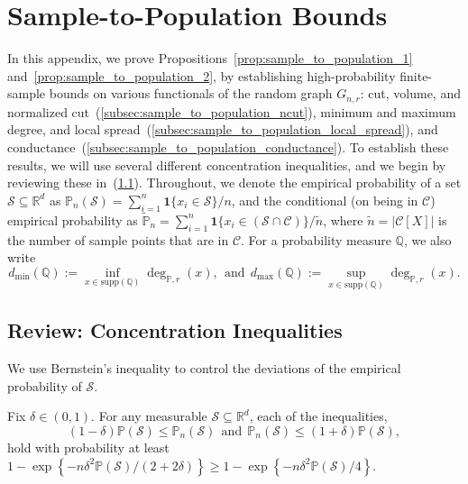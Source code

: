 \documentclass[twoside,11pt]{article}
\newcommand{\Reals}{\mathbb{R}}
\newcommand{\set}[1]{\left\{#1\right\}}
\newcommand{\1}{\mathbf{1}}
\newcommand{\Rd}{\Reals^d}
\newcommand{\mc}[1]{\mathcal{#1}}
\newcommand{\mbb}[1]{\mathbb{#1}}
\newcommand{\Pbb}{\mathbb{P}}
\newcommand{\Qbb}{\mathbb{Q}}
\newcommand{\wt}[1]{\widetilde{#1}}
\begin{document}
\section{Sample-to-Population Bounds}
\label{apdx:sample_to_population}
In this appendix, we prove Propositions~\ref{prop:sample_to_population_1} and~\ref{prop:sample_to_population_2}, by establishing high-probability finite-sample bounds on various functionals of the random graph $G_{n,r}$: cut, volume, and normalized cut~(\ref{subsec:sample_to_population_ncut}), minimum and maximum degree, and local spread~(\ref{subsec:sample_to_population_local_spread}), and conductance~(\ref{subsec:sample_to_population_conductance}). To establish these results, we will use several different concentration inequalities, and we begin by reviewing these in~(\ref{subsec:concentration}). Throughout, we denote the empirical probability of a set $\mc{S} \subseteq \Rd$ as $\Pbb_n(\mc{S}) = \sum_{i = 1}^{n} \1\{x_i \in \mc{S}\}/n$, and the conditional (on being in $\mc{C}$) empirical probability as $\wt{\Pbb}_n = \sum_{i = 1}^{n} \1\{x_i \in (\mc{S} \cap \mc{C})\}/\wt{n}$, where $\wt{n} = |\mc{C}[X]|$ is the number of sample points that are in $\mc{C}$. For a probability measure $\Qbb$, we also write
\begin{equation}
\label{eqn:population_minmax_degree}
d_{\min}(\Qbb) := \inf_{x \in \mathrm{supp}(\mbb{Q})} \deg_{\Pbb,r}(x),~~\textrm{and}~~d_{\max}(\Qbb) := \sup_{x \in \mathrm{supp}(\mbb{Q})} \deg_{\Pbb,r}(x).
\end{equation}

\subsection{Review: Concentration Inequalities}
\label{subsec:concentration}
We use Bernstein's inequality to control the deviations of the empirical probability of $\mc{S}$.
\begin{lemma}
	\label{lem:hoeffding_2}
	Fix $\delta \in (0,1)$. For any measurable $\mc{S} \subseteq \Rd$, each of the inequalities,
	\begin{equation*}
	(1 - \delta) \Pbb(\mathcal{S}) \leq \Pbb_n(\mathcal{S})~~\textrm{and}~~\Pbb_n(\mathcal{S}) \leq (1 + \delta)\Pbb(\mathcal{S}),
	\end{equation*}
	hold with probability at least $1 - \exp\set{-n\delta^2\Pbb(\mathcal{S})/(2 + 2\delta)} \geq 1 - \exp\set{-n\delta^2\Pbb(\mathcal{S})/4}$. 
\end{lemma}
\end{document}
